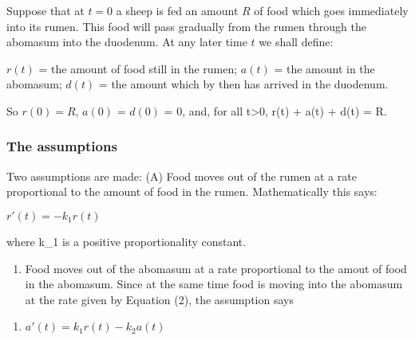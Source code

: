 \documentclass[]{article}
\providecommand{\tightlist}{%
  \setlength{\itemsep}{0pt}\setlength{\parskip}{0pt}}
\begin{document}
Suppose that at \(t = 0\) a sheep is fed an amount \(R\) of food which
goes immediately into its rumen. This food will pass gradually from the
rumen through the abomasum into the duodenum. At any later time \(t\) we
shall define:

\(r(t)\) = the amount of food still in the rumen; \(a(t)\) = the amount
in the abomasum; \(d(t)\) = the amount which by then has arrived in the
duodenum.

So \(r(0) = R\), \(a(0)\) = \(d(0)\) = 0, and, for all t\textgreater{}0,
r(t) + a(t) + d(t) = R.

\subsubsection{The assumptions}\label{the-assumptions}

Two assumptions are made: (A) Food moves out of the rumen at a rate
proportional to the amount of food in the rumen. Mathematically this
says:

\(r'(t) = -k_1r(t)\)

where k\_1 is a positive proportionality constant.

\begin{enumerate}
\def\labelenumi{(\Alph{enumi})}
\setcounter{enumi}{1}
\tightlist
\item
  Food moves out of the abomasum at a rate proportional to the amout of
  food in the abomasum. Since at the same time food is moving into the
  abomasum at the rate given by Equation (2), the assumption says
\end{enumerate}

\begin{enumerate}
\def\labelenumi{(\arabic{enumi})}
\setcounter{enumi}{2}
\tightlist
\item
  \(a'(t) = k_1r(t)-k_2a(t)\)
\end{enumerate}
\end{document}
